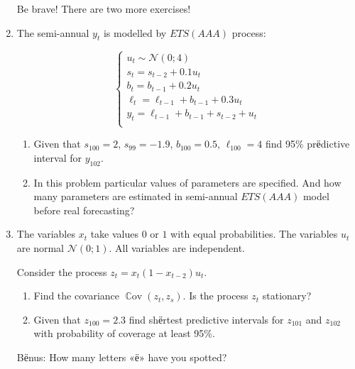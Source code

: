\documentclass[12pt]{article}
\DeclareMathOperator{\Cov}{\mathbb{C}ov}
\newcommand{\cN}{\mathcal{N}}
\begin{document}
\begin{enumerate}
    Be brave! There are two more exercises!
    \newpage

    \item The semi-annual $y_t$ is modelled by $ETS(AAA)$ process:
    
    \[
    \begin{cases}
        u_t \sim \cN(0; 4) \\
        s_t = s_{t-2} + 0.1 u_t \\
        b_t = b_{t-1} + 0.2 u_t \\
        \ell_t = \ell_{t-1} + b_{t-1} + 0.3 u_t \\
        y_t = \ell_{t-1} + b_{t-1} + s_{t-2} + u_t \\
    \end{cases}    
    \]

    \begin{enumerate}
        \item Given that $s_{100} = 2$, $s_{99} = -1.9$, $b_{100} = 0.5$, $\ell_{100} = 4$ find 95\% prёdictive interval for $y_{102}$. 
        \item In this problem particular values of parameters are specified. And how many parameters are estimated in semi-annual $ETS(AAA)$ model before real forecasting?
    \end{enumerate}

    \item The variables $x_t$ take values $0$ or $1$ with equal probabilities.
    The variables $u_t$ are normal $\cN(0; 1)$. All variables are independent.
    
    Consider the process  $z_t = x_t (1-x_{t-2}) u_t$.

    \begin{enumerate}
        \item Find the covariance $\Cov(z_t, z_s)$. Is the process $z_t$ stationary?
        \item Given that $z_{100} = 2.3$ find shёrtest predictive intervals for $z_{101}$ and $z_{102}$ with probability of coverage at least 95\%.
    \end{enumerate}

    \item[Bёnus:] How many letters «ё» have you spotted?
    
 
\end{enumerate}
\end{document}
